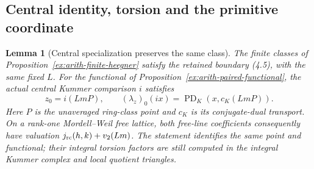 \documentclass[11pt]{article}
\newtheorem{lemma}[theorem]{Lemma}
\theoremstyle{definition}
\theoremstyle{remark}
\begin{document}
\subsection{Central identity, torsion and the primitive coordinate}
\begin{lemma}[Central specialization preserves the same class]\label{ex:arith-central-specialization}
The finite classes of Proposition~\ref{ex:arith-finite-heegner}
satisfy the retained boundary (4.5), with the same fixed $L$.
For the functional of Proposition~\ref{ex:arith-paired-functional},
the actual central Kummer comparison $i$ satisfies
\[
 z_0=i(LmP),\qquad
 (\lambda_z)_0(i x)=\operatorname{PD}_K(x,c_K(LmP)).
\]
Here $P$ is the unaveraged ring-class point and $c_K$ is its
conjugate-dual transport. On a rank-one Mordell--Weil free lattice,
both free-line coefficients consequently have valuation
$j_{\rm rc}(h,k)+v_2(Lm)$. The statement identifies the same point
and functional; their integral torsion factors are still computed
in the integral Kummer complex and local quotient triangles.
\end{lemma}
\end{document}
